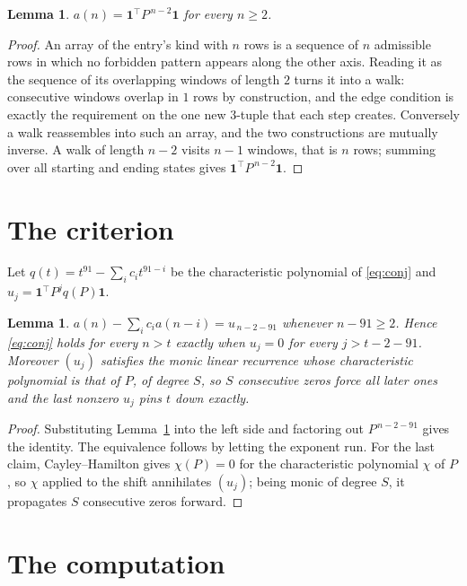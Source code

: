\documentclass[11pt,a4paper]{article}
\theoremstyle{plain}
\newtheorem{lemma}[theorem]{Lemma}
\theoremstyle{definition}
\begin{document}
\begin{lemma}\label{lem:walk}
$a(n)=\mathbf{1}^{\!\top}P^{\,n-2}\mathbf{1}$ for every $n\ge2$.
\end{lemma}

\begin{proof}
An array of the entry's kind with $n$ rows is a sequence of $n$ admissible rows in
which no forbidden pattern appears along the other axis. Reading it as the sequence of its
overlapping windows of length $2$ turns it into a walk: consecutive windows overlap in
$1$ rows by construction, and the edge condition is exactly the requirement on the one
new $3$-tuple that each step creates. Conversely a walk reassembles into such an array,
and the two constructions are mutually inverse. A walk of length $n-2$ visits $n-1$
windows, that is $n$ rows; summing over all starting and ending states gives
$\mathbf{1}^{\!\top}P^{\,n-2}\mathbf{1}$.
\end{proof}

\section{The criterion}

Let $q(t)=t^{91}-\sum_i c_i t^{91-i}$ be the characteristic polynomial of
\eqref{eq:conj} and $u_j=\mathbf{1}^{\!\top}P^{j}q(P)\mathbf{1}$.

\begin{lemma}\label{lem:crit}
$a(n)-\sum_i c_i a(n-i)=u_{\,n-2-91}$ whenever $n-91\ge2$. Hence
\eqref{eq:conj} holds for every $n>t$ exactly when $u_j=0$ for every
$j>t-2-91$. Moreover $(u_j)$ satisfies the monic linear recurrence whose
characteristic polynomial is that of $P$, of degree $S$, so $S$ consecutive zeros force all
later ones and the last nonzero $u_j$ pins $t$ down exactly.
\end{lemma}

\begin{proof}
Substituting Lemma~\ref{lem:walk} into the left side and factoring out
$P^{\,n-2-91}$ gives the identity. The equivalence follows by letting the exponent
run. For the last claim, Cayley--Hamilton gives $\chi(P)=0$ for the characteristic
polynomial $\chi$ of $P$, so $\chi$ applied to the shift annihilates $(u_j)$; being monic of
degree $S$, it propagates $S$ consecutive zeros forward.
\end{proof}

\section{The computation}
\end{document}

